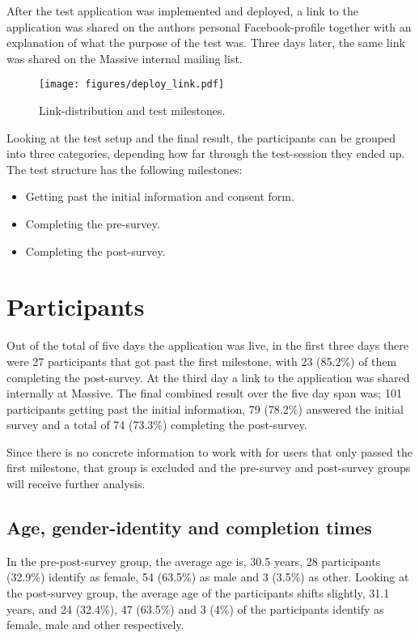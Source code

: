 After the test application was implemented and deployed, a link to the
application was shared on the authors personal Facebook-profile together
with an explanation of what the purpose of the test was. Three days
later, the same link was shared on the Massive internal mailing list.

\begin{figure}[h!]
  \centering
  \texttt{[image: figures/deploy\_link.pdf]}
  \caption{Link-distribution and test milestones.}
  \label{label_milestones}
\end{figure}

Looking at the test setup and the final result, the participants can be
grouped into three categories, depending how far through the test-session
they ended up. The test structure has the following milestones:
\begin{itemize}
  \item{Getting past the initial information and consent form.}
  \item{Completing the pre-survey.}
  \item{Completing the post-survey.}
\end{itemize}

\section{Participants}

Out of the total of five days the application was live, in the first
three days there were 27 participants that got past the first milestone,
with 23 (85.2\%) of them completing the post-survey. At the third day a
link to the application was shared internally at Massive. The final
combined result over the five day span was; 101 participants getting past
the initial information, 79 (78.2\%) answered the initial survey and a
total of 74 (73.3\%) completing the post-survey.

Since there is no concrete information to work with for users that only
passed the first milestone, that group is excluded and the pre-survey and
post-survey groups will receive further analysis.

  \subsection{Age, gender-identity and completion times}

  In the pre-post-survey group, the average age is, 30.5 years, 28
  participants (32.9\%) identify as female, 54 (63.5\%) as male and 3
  (3.5\%) as other. Looking at the post-survey group, the average age of
  the participants shifts slightly, 31.1 years, and 24 (32.4\%), 47
  (63.5\%) and 3 (4\%) of the participants identify as female, male and
  other respectively.

